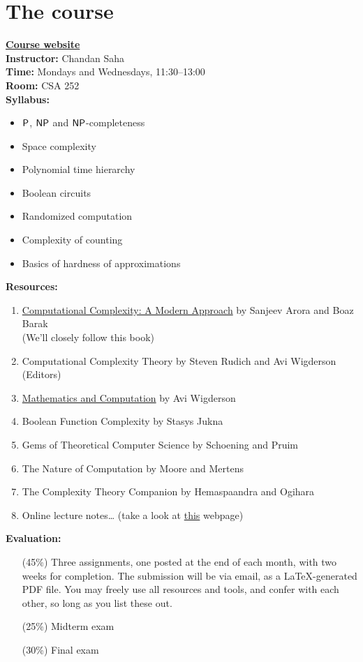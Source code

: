\chapter*{The course}


\textbf{\href{https://www.csa.iisc.ac.in/~chandan/courses/complexity25/home.html}{Course website}} \\
\textbf{Instructor:} Chandan Saha \\
\textbf{Time:} Mondays and Wednesdays, 11:30--13:00 \\
\textbf{Room:} CSA 252
\\[1em]
\textbf{Syllabus:}
\begin{itemize}
    \item $\P$, $\NP$ and $\NP$-completeness
    \item Space complexity
    \item Polynomial time hierarchy
    \item Boolean circuits
    \item Randomized computation
    \item Complexity of counting
    \item Basics of hardness of approximations
\end{itemize}
\vspace{1em}
\textbf{Resources:}
\begin{enumerate}
    \item \href{https://www.cs.princeton.edu/theory/complexity/}{Computational Complexity: A Modern Approach}
        by Sanjeev Arora and Boaz Barak \\
        (We'll closely follow this book)
    \item Computational Complexity Theory by Steven Rudich and Avi Wigderson
        (Editors)
    \item \href{https://www.math.ias.edu/files/Book-online-Aug0619.pdf}{Mathematics and Computation}
        by Avi Wigderson
    \item Boolean Function Complexity by Stasys Jukna
    \item Gems of Theoretical Computer Science by Schoening and Pruim
    \item The Nature of Computation by Moore and Mertens
    \item The Complexity Theory Companion by Hemaspaandra and Ogihara
    \item Online lecture notes\dots{}
        (take a look at \href{https://www.cs.cmu.edu/~odonnell/complexity/}{this} webpage)
\end{enumerate}
\vspace{1em}
\textbf{Evaluation:}
\begin{itemize}
    \item[(45\%)] Three assignments, one posted at the end of each month,
        with two weeks for completion.
        The submission will be via email, as a \LaTeX-generated PDF file.
        You may freely use all resources and tools, and confer with each
        other, so long as you list these out.
    \item[(25\%)] Midterm exam
    \item[(30\%)] Final exam
\end{itemize}

